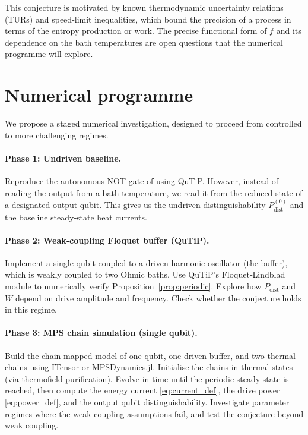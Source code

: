 \documentclass[11pt,a4paper]{article}
\theoremstyle{definition}
\theoremstyle{remark}
\begin{document}
This conjecture is motivated by known thermodynamic uncertainty relations (TURs) and speed‑limit inequalities, which bound the precision of a process in terms of the entropy production or work. The precise functional form of $f$ and its dependence on the bath temperatures are open questions that the numerical programme will explore.

\section{Numerical programme}\label{sec:numerics}
We propose a staged numerical investigation, designed to proceed from controlled to more challenging regimes.

\paragraph{Phase 1: Undriven baseline.}
Reproduce the autonomous NOT gate of \cite{LipkaBartosik2024} using QuTiP. However, instead of reading the output from a bath temperature, we read it from the reduced state of a designated output qubit. This gives us the undriven distinguishability $P_{\text{dist}}^{(0)}$ and the baseline steady‑state heat currents.

\paragraph{Phase 2: Weak‑coupling Floquet buffer (QuTiP).}
Implement a single qubit coupled to a driven harmonic oscillator (the buffer), which is weakly coupled to two Ohmic baths. Use QuTiP’s Floquet‑Lindblad module to numerically verify Proposition~\ref{prop:periodic}. Explore how $P_{\text{dist}}$ and $\overline{W}$ depend on drive amplitude and frequency. Check whether the conjecture holds in this regime.

\paragraph{Phase 3: MPS chain simulation (single qubit).}
Build the chain‑mapped model of one qubit, one driven buffer, and two thermal chains using ITensor or MPSDynamics.jl. Initialise the chains in thermal states (via thermofield purification). Evolve in time until the periodic steady state is reached, then compute the energy current \eqref{eq:current_def}, the drive power \eqref{eq:power_def}, and the output qubit distinguishability. Investigate parameter regimes where the weak‑coupling assumptions fail, and test the conjecture beyond weak coupling.
\end{document}
